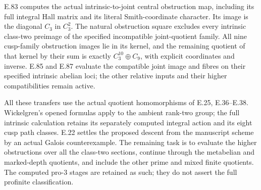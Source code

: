 E.83 computes the actual intrinsic-to-joint central obstruction
map, including its full integral Hall matrix and its literal
Smith-coordinate character. Its image is the diagonal $C_3$
in $C_3^2$. The natural obstruction square excludes every
intrinsic class-two preimage of the specified incompatible
joint-quotient family. All nine cusp-family obstruction images
lie in its kernel, and the remaining quotient of that kernel
by their sum is exactly $C_3^{10}\oplus C_9$, with explicit
coordinates and inverse. E.85 and E.87 evaluate the compatible joint image and fibres
on their specified intrinsic abelian loci; the other relative
inputs and their higher compatibilities remain active.

All these transfers use the actual quotient homomorphisms
of E.25, E.36--E.38. Wickelgren's opened formulas apply
to the ambient rank-two group; the full intrinsic
calculation retains its separately computed integral
action and its eight cusp path classes. E.22 settles
the proposed descent from the manuscript scheme by an
actual Galois counterexample. The remaining task is to
evaluate the higher obstructions over all the class-two
sections, continue through the metabelian and marked-depth
quotients, and include the other prime and mixed finite
quotients. The computed pro-$3$ stages are retained as
such; they do not assert the full profinite classification.
